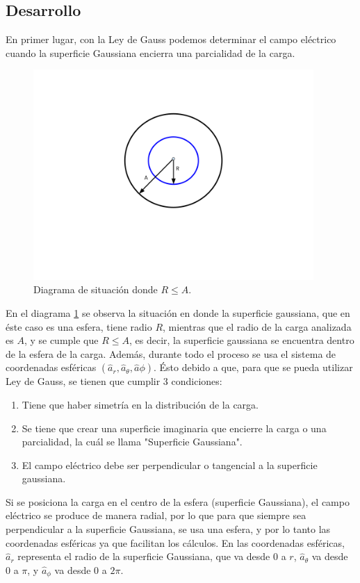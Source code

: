 \documentclass[12pt, letterpaper]{report}
\begin{document}
\subsection*{Desarrollo}
En primer lugar, con la Ley de Gauss podemos determinar el campo eléctrico cuando la superficie Gaussiana encierra una parcialidad de la carga. 
\begin{figure}[H]
    \centering
    \includegraphics[height = 8cm]{2024-04-18_Diagrama1_ActividadCargas.png}
    \caption{Diagrama de situación donde $R\leq A$. }
    \label{fig:fig1}
\end{figure}
En el diagrama \ref{fig:fig1} se observa la situación en donde la superficie gaussiana, que en éste caso es una esfera, tiene radio $R$, mientras que el radio de la carga 
analizada es $A$, y se cumple que $R \leq A$, es decir, la superficie gaussiana se encuentra dentro de la esfera de la carga. Además, durante todo el proceso se usa el sistema de 
coordenadas esféricas $(\hat{a}_r, \hat{a}_\theta, \hat{a}\phi)$. Ésto debido a que, para que se pueda utilizar Ley de Gauss, se tienen que cumplir 3 condiciones: 
\begin{enumerate}
\item Tiene que haber simetría en la distribución de la carga. 
\item Se tiene que crear una superficie imaginaria que encierre la carga o una parcialidad, la cuál se llama "Superficie Gaussiana". 
\item El campo eléctrico debe ser perpendicular o tangencial a la superficie gaussiana. 
\end{enumerate}
Si se posiciona la carga en el centro de la esfera (superficie Gaussiana), el campo eléctrico se produce de manera radial, por lo que para que siempre sea perpendicular 
a la superficie Gaussiana, se usa una esfera, y por lo tanto las coordenadas esféricas ya que facilitan los cálculos. En las coordenadas esféricas, $\hat{a}_r$ representa el radio de la 
superficie Gaussiana, que va desde $0$ a $r$, $\hat{a}_\theta$ va desde $0$ a $\pi$, y $\hat{a}_\phi$ va desde $0$ a $2\pi$. \\ 
\end{document}

